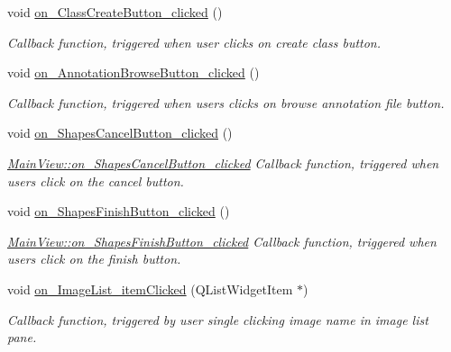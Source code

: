 \begin{DoxyCompactItemize}
void \hyperlink{classMainView_a3edf1fc4556c571b3d2130db22da504e}{on\+\_\+\+Class\+Create\+Button\+\_\+clicked} ()
\begin{DoxyCompactList}\small\item\em Callback function, triggered when user clicks on create class button. \end{DoxyCompactList}\item 
\mbox{\label{classMainView_a4995ea260acd3abf8ac31f148f2415ca}} 
void \hyperlink{classMainView_a4995ea260acd3abf8ac31f148f2415ca}{on\+\_\+\+Annotation\+Browse\+Button\+\_\+clicked} ()
\begin{DoxyCompactList}\small\item\em Callback function, triggered when users clicks on browse annotation file button. \end{DoxyCompactList}\item 
\mbox{\label{classMainView_abd9345221c7c8e2ebbc0703db1a05ddf}} 
void \hyperlink{classMainView_abd9345221c7c8e2ebbc0703db1a05ddf}{on\+\_\+\+Shapes\+Cancel\+Button\+\_\+clicked} ()
\begin{DoxyCompactList}\small\item\em \hyperlink{classMainView_abd9345221c7c8e2ebbc0703db1a05ddf}{Main\+View\+::on\+\_\+\+Shapes\+Cancel\+Button\+\_\+clicked} Callback function, triggered when users click on the cancel button. \end{DoxyCompactList}\item 
\mbox{\label{classMainView_a179305fe64065facf0fe655917a39378}} 
void \hyperlink{classMainView_a179305fe64065facf0fe655917a39378}{on\+\_\+\+Shapes\+Finish\+Button\+\_\+clicked} ()
\begin{DoxyCompactList}\small\item\em \hyperlink{classMainView_a179305fe64065facf0fe655917a39378}{Main\+View\+::on\+\_\+\+Shapes\+Finish\+Button\+\_\+clicked} Callback function, triggered when users click on the finish button. \end{DoxyCompactList}\item 
void \hyperlink{classMainView_a21afbf21cbe8fc3e444d57cd575e69b0}{on\+\_\+\+Image\+List\+\_\+item\+Clicked} (Q\+List\+Widget\+Item $\ast$)
\begin{DoxyCompactList}\small\item\em Callback function, triggered by user single clicking image name in image list pane. \end{DoxyCompactList}\item 

\end{DoxyCompactItemize}
